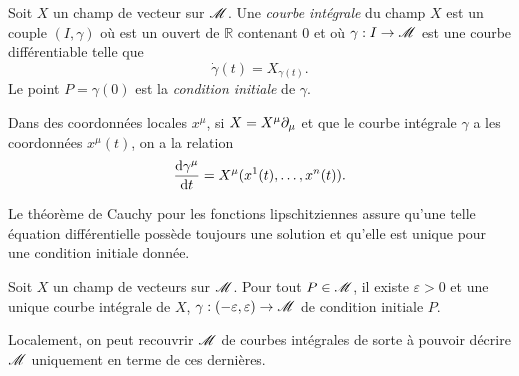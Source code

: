 \documentclass[a4paper,11pt]{report}
\begin{document}
            \begin{defn}
             Soit $X$ un champ de vecteur sur $\mathscr{M}$. Une \textit{courbe intégrale} du champ $X$ est un couple $(I,\gamma)$ où est un ouvert de $\mathbb{R}$ contenant 0 et où $\gamma:I\to\mathscr{M}$ est une courbe différentiable telle que
             \begin{equation}
                 \dot{\gamma}(t) = X_{\gamma(t)}.
             \end{equation}
             Le point $P = \gamma(0)$ est la \textit{condition initiale} de $\gamma$.
            \end{defn}
            
            Dans des coordonnées locales $x^\mu$, si $X = X^\mu\partial_\mu$ et que le courbe intégrale $\gamma$ a les coordonnées $x^\mu(t)$, on a la relation
            \begin{align}
                \dv{\gamma^\mu}{t} = X^\mu(x^1(t),\dots,x^n(t)).
            \end{align}
            
            Le théorème de Cauchy pour les fonctions lipschitziennes assure qu'une telle équation différentielle possède toujours une solution et qu'elle est unique pour une condition initiale donnée.
            
            \begin{prop}
            \begin{leftbar}
                Soit $X$ un champ de vecteurs sur $\mathscr{M}$. Pour tout $P\in\mathscr{M}$, il existe $\varepsilon>0$ et une unique courbe intégrale de $X$, $\gamma:(-\varepsilon,\varepsilon)\to\mathscr{M}$ de condition initiale $P$.
            \end{leftbar}
            \end{prop}
            
            Localement, on peut recouvrir $\mathscr{M}$ de courbes intégrales de sorte à pouvoir décrire $\mathscr{M}$ uniquement en terme de ces dernières.
            
\end{document}
